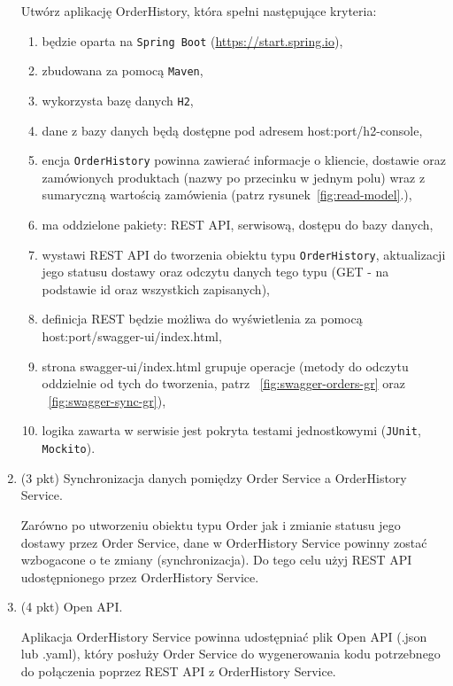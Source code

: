\documentclass[12pt]{article}
\begin{document}
\begin{enumerate}
            Utwórz aplikację OrderHistory, która spełni następujące kryteria:
            \begin{enumerate}
                \item będzie oparta na \texttt{Spring Boot} (\url{https://start.spring.io}),
                \item zbudowana za pomocą \texttt{Maven},
                \item wykorzysta bazę danych \texttt{H2},
                \item dane z bazy danych będą dostępne pod adresem host:port/h2-console,
                \item encja \texttt{OrderHistory} powinna zawierać informacje o kliencie, dostawie oraz zamówionych produktach (nazwy po przecinku w jednym polu) wraz z sumaryczną wartością zamówienia (patrz rysunek~\ref{fig:read-model}.),
                \item ma oddzielone pakiety: REST API, serwisową, dostępu do bazy danych,
                \item wystawi REST API do tworzenia obiektu typu \texttt{OrderHistory}, aktualizacji jego statusu dostawy oraz odczytu danych tego typu (GET - na podstawie id oraz wszystkich zapisanych),
                \item definicja REST będzie możliwa do wyświetlenia za pomocą host:port/swagger-ui/index.html,
                \item strona swagger-ui/index.html grupuje operacje (metody do odczytu oddzielnie od tych do tworzenia, patrz ~\ref{fig:swagger-orders-gr} oraz ~\ref{fig:swagger-sync-gr}),
                \item logika zawarta w serwisie jest pokryta testami jednostkowymi (\texttt{JUnit}, \texttt{Mockito}).
            \end{enumerate}

        \item\label{exc:cqrs_sync}
            (3 pkt) Synchronizacja danych pomiędzy Order Service a OrderHistory Service.

            Zarówno po utworzeniu obiektu typu Order jak i zmianie statusu jego dostawy przez Order Service, dane w OrderHistory Service powinny zostać wzbogacone o te zmiany (synchronizacja).
            Do tego celu użyj REST API udostępnionego przez OrderHistory Service.
        \item\label{exc:openapi}
            (4 pkt) Open API.

            Aplikacja OrderHistory Service powinna udostępniać plik Open API (.json lub .yaml), który posłuży Order Service do wygenerowania kodu potrzebnego do połączenia poprzez REST API z OrderHistory Service.


\end{enumerate}
\end{document}
